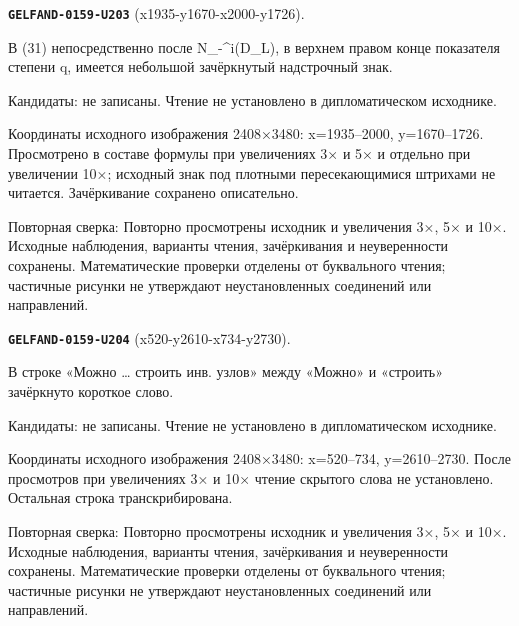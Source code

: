 \par\noindent\leavevmode{}\label{GELFAND-0159-U203}\label{GELFAND-P001467:x1935-y1670-x2000-y1726}\textbf{\texttt{GELFAND-0159-U203}} (x1935-y1670-x2000-y1726).\nopagebreak[4]\par
В (31) непосредственно после N\_-\textasciicircum{}i(D\_L), в верхнем правом конце показателя степени q, имеется небольшой зачёркнутый надстрочный знак.\par
Кандидаты: не записаны. Чтение не установлено в дипломатическом исходнике.\par
Координаты исходного изображения 2408×3480: x=1935–2000, y=1670–1726. Просмотрено в составе формулы при увеличениях 3× и 5× и отдельно при увеличении 10×; исходный знак под плотными пересекающимися штрихами не читается. Зачёркивание сохранено описательно.\par
Повторная сверка: Повторно просмотрены исходник и увеличения 3×, 5× и 10×. Исходные наблюдения, варианты чтения, зачёркивания и неуверенности сохранены. Математические проверки отделены от буквального чтения; частичные рисунки не утверждают неустановленных соединений или направлений.\par\medskip
\par\noindent\leavevmode{}\label{GELFAND-0159-U204}\label{GELFAND-P001467:x520-y2610-x734-y2730}\textbf{\texttt{GELFAND-0159-U204}} (x520-y2610-x734-y2730).\nopagebreak[4]\par
В строке «Можно … строить инв. узлов» между «Можно» и «строить» зачёркнуто короткое слово.\par
Кандидаты: не записаны. Чтение не установлено в дипломатическом исходнике.\par
Координаты исходного изображения 2408×3480: x=520–734, y=2610–2730. После просмотров при увеличениях 3× и 10× чтение скрытого слова не установлено. Остальная строка транскрибирована.\par
Повторная сверка: Повторно просмотрены исходник и увеличения 3×, 5× и 10×. Исходные наблюдения, варианты чтения, зачёркивания и неуверенности сохранены. Математические проверки отделены от буквального чтения; частичные рисунки не утверждают неустановленных соединений или направлений.\par\medskip
